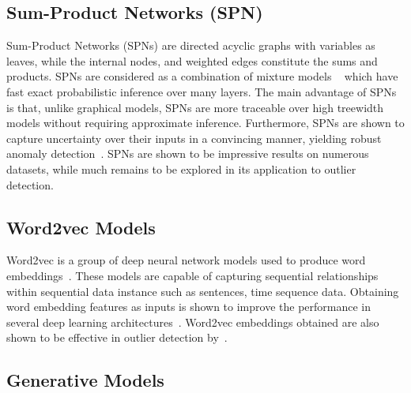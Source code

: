 \subsection{ Sum-Product Networks (SPN)}
\label{sec:spn}
Sum-Product Networks (SPNs) are directed acyclic graphs with variables as leaves, while the internal nodes, and weighted edges constitute the sums and products. SPNs are considered as a combination of mixture models ~\cite{poon2011sum,peharz2018probabilistic} which have fast exact probabilistic inference over many layers. The main advantage of SPNs is that, unlike graphical models, SPNs are more traceable over high treewidth models without requiring approximate inference. Furthermore, SPNs are shown to capture uncertainty over their inputs in a convincing manner, yielding robust anomaly detection~\cite{peharz2018probabilistic}. SPNs are shown to be  impressive results on numerous datasets, while much remains to be explored in its application to outlier detection.

\subsection{Word2vec Models}
\label{sec:word2vec}
Word2vec is a group of deep neural network models used to produce word embeddings~\cite{mikolov2013efficient}. These models are capable of capturing sequential relationships within sequential data instance such as sentences, time sequence data. Obtaining word embedding features as inputs is shown to improve the performance in several deep learning architectures~\cite{rezaeinia2017improving,naili2017comparative,altszyler2016comparative}. Word2vec embeddings obtained are also shown to be effective in outlier detection by~\cite{schnabel2015evaluation,bertero2017experience,bakarov2018anomaly,bamler2017dynamic}.


\subsection{Generative Models }
\label{sec:gan_adversarial}


